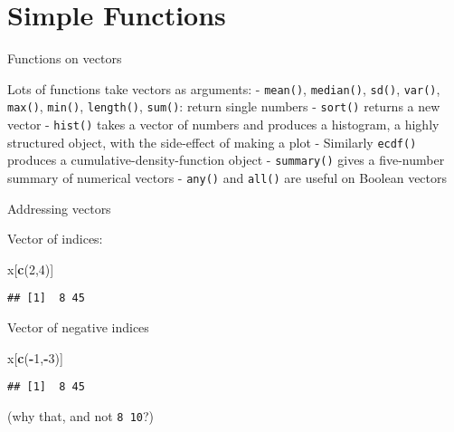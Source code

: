 \documentclass[8pt,ignorenonframetext,]{beamer}
\newenvironment{Shaded}{\begin{snugshade}}{\end{snugshade}}
\newcommand{\KeywordTok}[1]{\textcolor[rgb]{0.13,0.29,0.53}{\textbf{#1}}}
\newcommand{\DecValTok}[1]{\textcolor[rgb]{0.00,0.00,0.81}{#1}}
\newcommand{\OperatorTok}[1]{\textcolor[rgb]{0.81,0.36,0.00}{\textbf{#1}}}
\newcommand{\NormalTok}[1]{#1}
\begin{document}
\section{Simple Functions}\label{simple-functions}

\begin{frame}[fragile]{Functions on vectors}

Lots of functions take vectors as arguments: - \texttt{mean()},
\texttt{median()}, \texttt{sd()}, \texttt{var()}, \texttt{max()},
\texttt{min()}, \texttt{length()}, \texttt{sum()}: return single numbers
- \texttt{sort()} returns a new vector - \texttt{hist()} takes a vector
of numbers and produces a histogram, a highly structured object, with
the side-effect of making a plot - Similarly \texttt{ecdf()} produces a
cumulative-density-function object - \texttt{summary()} gives a
five-number summary of numerical vectors - \texttt{any()} and
\texttt{all()} are useful on Boolean vectors

\end{frame}

\begin{frame}[fragile]{Addressing vectors}

Vector of indices:

\begin{Shaded}
\begin{Highlighting}[]
\NormalTok{x[}\KeywordTok{c}\NormalTok{(}\DecValTok{2}\NormalTok{,}\DecValTok{4}\NormalTok{)]}
\end{Highlighting}
\end{Shaded}

\begin{verbatim}
## [1]  8 45
\end{verbatim}

Vector of negative indices

\begin{Shaded}
\begin{Highlighting}[]
\NormalTok{x[}\KeywordTok{c}\NormalTok{(}\OperatorTok{-}\DecValTok{1}\NormalTok{,}\OperatorTok{-}\DecValTok{3}\NormalTok{)]}
\end{Highlighting}
\end{Shaded}

\begin{verbatim}
## [1]  8 45
\end{verbatim}

(why that, and not \texttt{8\ 10}?)

\end{frame}
\end{document}
